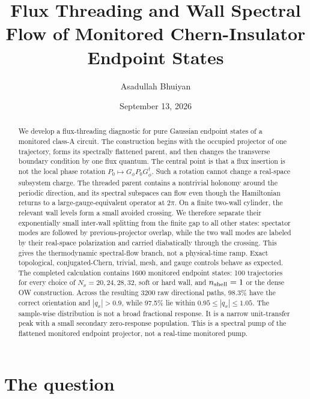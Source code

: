 \documentclass[aps,prb,twocolumn,floatfix,nofootinbib,superscriptaddress]{revtex4-2}
\begin{document}
\title{Flux Threading and Wall Spectral Flow of Monitored Chern-Insulator Endpoint States}
\author{Asadullah Bhuiyan}
\date{September 13, 2026}

\begin{abstract}
We develop a flux-threading diagnostic for pure Gaussian endpoint states of a
monitored class-A circuit.  The construction begins with the occupied
projector of one trajectory, forms its spectrally flattened parent, and then
changes the transverse boundary condition by one flux quantum.  The central
point is that a flux insertion is not the local phase rotation
$P_0\mapsto G_\phi P_0G_\phi^\dagger$.  Such a rotation cannot change a
real-space subsystem charge.  The threaded parent contains a nontrivial
holonomy around the periodic direction, and its spectral subspaces can flow
even though the Hamiltonian returns to a large-gauge-equivalent operator at
$2\pi$.  On a finite two-wall cylinder, the relevant wall levels form a
small avoided crossing.  We therefore separate their exponentially small
inter-wall splitting from the finite gap to all other states: spectator
modes are followed by previous-projector overlap, while the two wall modes
are labeled by their real-space polarization and carried diabatically
through the crossing.  This gives the thermodynamic spectral-flow branch,
not a physical-time ramp.  Exact topological, conjugated-Chern, trivial,
mesh, and gauge controls behave as expected.  The completed calculation
contains 1600 monitored endpoint states: 100 trajectories for every choice
of $N_x=20,24,28,32$, soft or hard wall, and $n_{\rm shell}=1$ or the dense
OW construction.  Across the resulting 3200 raw directional paths, 98.3\%
have the correct orientation and $|q_x|>0.9$, while 97.5\% lie within
$0.95\leq |q_x|\leq1.05$.  The sample-wise distribution is not a broad
fractional response.  It is a narrow unit-transfer peak with a small
secondary zero-response population.  This is a spectral pump of the
flattened monitored endpoint projector, not a real-time monitored pump.
\end{abstract}

\maketitle
\setcounter{tocdepth}{2}
\tableofcontents

\section{The question}
\end{document}
